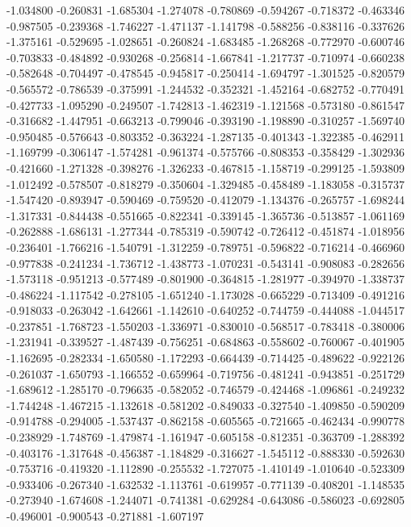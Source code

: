 -1.034800
-0.260831
-1.685304
-1.274078
-0.780869
-0.594267
-0.718372
-0.463346
-0.987505
-0.239368
-1.746227
-1.471137
-1.141798
-0.588256
-0.838116
-0.337626
-1.375161
-0.529695
-1.028651
-0.260824
-1.683485
-1.268268
-0.772970
-0.600746
-0.703833
-0.484892
-0.930268
-0.256814
-1.667841
-1.217737
-0.710974
-0.660238
-0.582648
-0.704497
-0.478545
-0.945817
-0.250414
-1.694797
-1.301525
-0.820579
-0.565572
-0.786539
-0.375991
-1.244532
-0.352321
-1.452164
-0.682752
-0.770491
-0.427733
-1.095290
-0.249507
-1.742813
-1.462319
-1.121568
-0.573180
-0.861547
-0.316682
-1.447951
-0.663213
-0.799046
-0.393190
-1.198890
-0.310257
-1.569740
-0.950485
-0.576643
-0.803352
-0.363224
-1.287135
-0.401343
-1.322385
-0.462911
-1.169799
-0.306147
-1.574281
-0.961374
-0.575766
-0.808353
-0.358429
-1.302936
-0.421660
-1.271328
-0.398276
-1.326233
-0.467815
-1.158719
-0.299125
-1.593809
-1.012492
-0.578507
-0.818279
-0.350604
-1.329485
-0.458489
-1.183058
-0.315737
-1.547420
-0.893947
-0.590469
-0.759520
-0.412079
-1.134376
-0.265757
-1.698244
-1.317331
-0.844438
-0.551665
-0.822341
-0.339145
-1.365736
-0.513857
-1.061169
-0.262888
-1.686131
-1.277344
-0.785319
-0.590742
-0.726412
-0.451874
-1.018956
-0.236401
-1.766216
-1.540791
-1.312259
-0.789751
-0.596822
-0.716214
-0.466960
-0.977838
-0.241234
-1.736712
-1.438773
-1.070231
-0.543141
-0.908083
-0.282656
-1.573118
-0.951213
-0.577489
-0.801900
-0.364815
-1.281977
-0.394970
-1.338737
-0.486224
-1.117542
-0.278105
-1.651240
-1.173028
-0.665229
-0.713409
-0.491216
-0.918033
-0.263042
-1.642661
-1.142610
-0.640252
-0.744759
-0.444088
-1.044517
-0.237851
-1.768723
-1.550203
-1.336971
-0.830010
-0.568517
-0.783418
-0.380006
-1.231941
-0.339527
-1.487439
-0.756251
-0.684863
-0.558602
-0.760067
-0.401905
-1.162695
-0.282334
-1.650580
-1.172293
-0.664439
-0.714425
-0.489622
-0.922126
-0.261037
-1.650793
-1.166552
-0.659964
-0.719756
-0.481241
-0.943851
-0.251729
-1.689612
-1.285170
-0.796635
-0.582052
-0.746579
-0.424468
-1.096861
-0.249232
-1.744248
-1.467215
-1.132618
-0.581202
-0.849033
-0.327540
-1.409850
-0.590209
-0.914788
-0.294005
-1.537437
-0.862158
-0.605565
-0.721665
-0.462434
-0.990778
-0.238929
-1.748769
-1.479874
-1.161947
-0.605158
-0.812351
-0.363709
-1.288392
-0.403176
-1.317648
-0.456387
-1.184829
-0.316627
-1.545112
-0.888330
-0.592630
-0.753716
-0.419320
-1.112890
-0.255532
-1.727075
-1.410149
-1.010640
-0.523309
-0.933406
-0.267340
-1.632532
-1.113761
-0.619957
-0.771139
-0.408201
-1.148535
-0.273940
-1.674608
-1.244071
-0.741381
-0.629284
-0.643086
-0.586023
-0.692805
-0.496001
-0.900543
-0.271881
-1.607197
